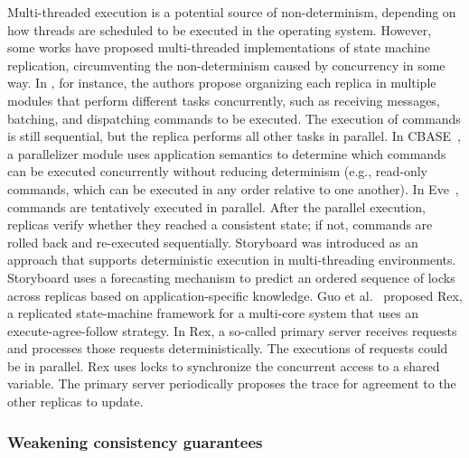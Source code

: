 Multi-threaded execution is a potential source of non-determinism, depending on
how threads are scheduled to be executed in the operating system. However, some
works have proposed multi-threaded implementations of state machine replication,
circumventing the non-determinism caused by concurrency in some way. In
\cite{santos2013htsmr}, for instance, the authors propose organizing each
replica in multiple modules that perform different tasks concurrently, such as
receiving messages, batching, and dispatching commands to be executed. The
execution of commands is still sequential, but the replica performs all other
tasks in parallel. In CBASE~\cite{Kotla:2004ep}, a parallelizer module uses
application semantics to determine which commands can be executed concurrently
without reducing determinism (e.g., read-only commands, which can be executed in
any order relative to one another). In Eve~\cite{Kapritsos:2012um}, commands are
tentatively executed in parallel. After the parallel execution, replicas verify
whether they reached a consistent state; if not, commands are rolled back and
re-executed sequentially. Storyboard \cite{Kapitza:2010Storyboard} was
introduced as an approach that supports deterministic execution in
multi-threading environments. Storyboard uses a forecasting mechanism to
predict an ordered sequence of locks across replicas based on
application-specific knowledge. Guo et al.~\cite{guo2014rex} proposed Rex, a
replicated state-machine framework for a multi-core system that uses an
execute-agree-follow strategy. In Rex, a so-called primary server receives
requests and processes those requests deterministically. The executions of
requests could be in parallel. Rex uses locks to synchronize the concurrent
access to a shared variable. The primary server periodically proposes the trace
for agreement to the other replicas to update.

\subsubsection{Weakening consistency guarantees}

